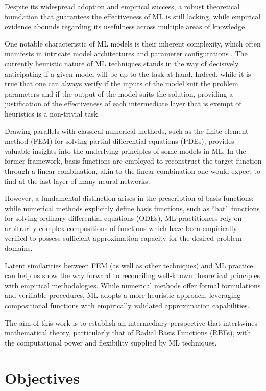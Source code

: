 \documentclass[12pt]{report} %
\begin{document}
Despite its widespread adoption and empirical success, a robust theoretical foundation that 
guarantees the effectiveness of ML is still lacking, while empirical evidence abounds 
regarding its usefulness across multiple areas of knowledge.

One notable characteristic of ML models is their inherent complexity, which often manifests 
in intricate model architectures and parameter configurations \cite{cuomo2022scientific}. 
The currently heuristic nature of ML techniques stands in the way of decisively 
anticipating if a given model will be up to the task at hand. 
Indeed, while it is true that one can always verify if the inputs of
the model suit the problem parameters and if the output of the model suits the solution,
providing a justification of the effectiveness of each intermediate layer that is
exempt of heuristics is a non-trivial task.

Drawing parallels with classical numerical methods, such as the finite element method (FEM) for 
solving partial differential equations (PDEs), provides valuable insights into the underlying 
principles of some models in ML. In the former framework, 
basis functions are employed to 
reconstruct the target function through a linear combination, akin to the linear combination 
one would expect to find at the last layer of many neural networks.

However, a fundamental distinction arises in the 
prescription of basis functions: while numerical methods explicitly define basis functions, 
such as ``hat'' functions for solving ordinary differential equations (ODEs), ML practitioners 
rely on arbitrarily complex compositions of functions which have been empirically verified 
to possess sufficient approximation capacity for the desired problem domains.

Latent similarities between FEM (as well as other techniques) and ML practice 
can help us show the way forward to reconciling well-known theoretical principles with 
empirical methodologies. While numerical
 methods offer formal formulations and verifiable procedures, ML adopts a more heuristic
  approach, leveraging compositional functions with empirically validated approximation 
  capabilities.

The aim of this work is to establish an intermediary perspective that intertwines
mathematical theory, particularly that of Radial Basis Functions (RBFs), with the
computational power and flexibility supplied by ML techniques. 


\section{Objectives}
\end{document}
